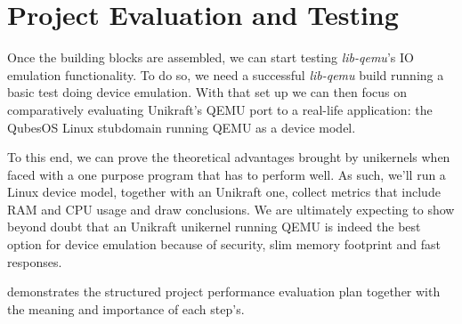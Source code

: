 \chapter{Project Evaluation and Testing}
\label{chapter:project-evaluation-testing}

Once the building blocks are assembled, we can start testing \textit{lib-qemu}'s IO emulation functionality.
To do so, we need a successful \textit{lib-qemu} build running a basic test doing device emulation.
With that set up we can then focus on comparatively evaluating Unikraft's QEMU port to a real-life application: the QubesOS Linux stubdomain running QEMU as a device model.

To this end, we can prove the theoretical advantages brought by unikernels when faced with a one purpose program that has to perform well.
As such, we'll run a Linux device model, together with an Unikraft one, collect metrics that include RAM and CPU usage and draw conclusions.
We are ultimately expecting to show beyond doubt that an Unikraft unikernel running QEMU is indeed the best option for device emulation because of security, slim memory footprint and fast responses.

 demonstrates the structured project performance evaluation plan together with the meaning and importance of each step's.

